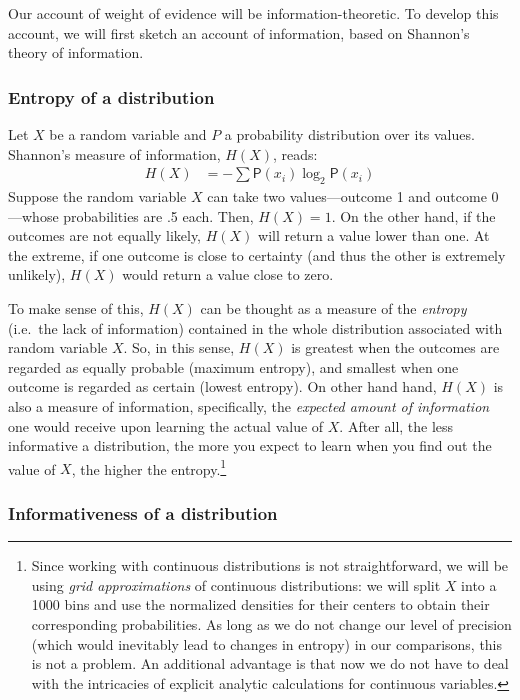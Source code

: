 \documentclass[
  10pt,
  dvipsnames,enabledeprecatedfontcommands]{scrartcl}
\begin{document}
Our account of weight of evidence will be information-theoretic. To
develop this account, we will first sketch an account of information,
based on Shannon's theory of information.

\hypertarget{entropy-of-a-distribution}{%
\subsubsection{Entropy of a
distribution}\label{entropy-of-a-distribution}}

Let \(X\) be a random variable and \(P\) a probability distribution over
its values. Shannon's measure of information, \(H(X)\), reads:
\begin{align*}
H(X)  & =
- \sum \mathsf{P}(x_i) \log_2 \mathsf{P}(x_i)
\end{align*} \noindent  Suppose the random variable \(X\) can take two
values---outcome 1 and outcome 0---whose probabilities are .5 each.
Then, \(H(X)=1\). On the other hand, if the outcomes are not equally
likely, \(H(X)\) will return a value lower than one. At the extreme, if
one outcome is close to certainty (and thus the other is extremely
unlikely), \(H(X)\) would return a value close to zero.

To make sense of this, \(H(X)\) can be thought as a measure of the
\textit{entropy} (i.e.~the lack of information) contained in the whole
distribution associated with random variable \(X\). So, in this sense,
\(H(X)\) is greatest when the outcomes are regarded as equally probable
(maximum entropy), and smallest when one outcome is regarded as certain
(lowest entropy). On other hand hand, \(H(X)\) is also a measure of
information, specifically, the \textit{expected amount of information}
one would receive upon learning the actual value of \(X\). After all,
the less informative a distribution, the more you expect to learn when
you find out the value of \(X\), the higher the entropy.\footnote{Since
  working with continuous distributions is not straightforward, we will
  be using \emph{grid approximations} of continuous distributions: we
  will split \(X\) into a 1000 bins and use the normalized densities for
  their centers to obtain their corresponding probabilities. As long as
  we do not change our level of precision (which would inevitably lead
  to changes in entropy) in our comparisons, this is not a problem. An
  additional advantage is that now we do not have to deal with the
  intricacies of explicit analytic calculations for continuous
  variables.}

\hypertarget{informativeness-of-a-distribution}{%
\subsubsection{Informativeness of a
distribution}\label{informativeness-of-a-distribution}}
\end{document}
